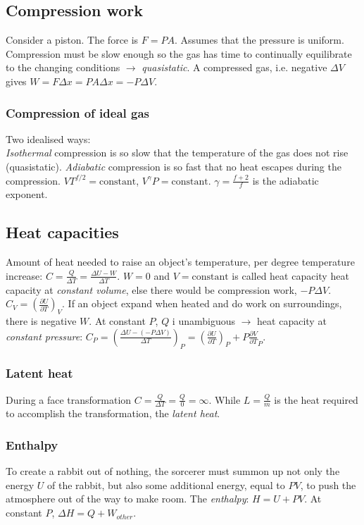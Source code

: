 \documentclass[11pt,twocolumn]{amsart}
\begin{document}
\subsection{Compression work}
Consider a piston. The force is $F=PA$. Assumes that the pressure is uniform. Compression must be slow enough so the gas has time to continually equilibrate to the changing conditions $\rightarrow$ \emph{quasistatic}. A compressed gas, i.e. negative $\Delta V$ gives $W=F\Delta x=PA\Delta x = -P\Delta V$. 
\subsubsection{Compression of ideal gas}
Two idealised ways: \\ \emph{Isothermal} compression is so slow that the temperature of the gas does not rise (quasistatic). \emph{Adiabatic} compression is so fast that no heat escapes during the compression. $VT^{f/2}=\text{constant}$, $V^{\gamma}P=\text{constant}$. $\gamma=\frac{f+2}{f}$ is the adiabatic exponent.

\subsection{Heat capacities}
Amount of heat needed to raise an object's temperature, per degree temperature increase: $C = \frac{Q}{\Delta T} = \frac{\Delta U - W}{\Delta T} $. $W=0$ and $V =\text{constant}$ is called heat capacity heat capacity at \emph{constant volume}, else there would be compression work, $-P\Delta V$. $C_V=\left(\frac{\partial U}{\partial T}\right)_V$. If an object expand when heated and do work on surroundings, there is negative $W$. At constant $P$, $Q$ i unambiguous $\rightarrow$ heat capacity at \emph{constant pressure}: $C_P = \left(\frac{\Delta U -(-P\Delta V)}{\Delta T}\right)_P=\left(\frac{\partial U}{\partial T}\right)_P + P\frac{\partial V}{\partial T}_P$.
\subsubsection{Latent heat} During a face transformation $C = \frac{Q}{\Delta T} = \frac{Q}{0} = \infty$. While $L=\frac{Q}{m}$ is the heat required to accomplish the transformation, the \emph{latent heat}.
\subsubsection{Enthalpy} To create a rabbit out of nothing, the sorcerer must summon up not only the energy $U$ of the rabbit, but also some additional energy, equal to $PV$, to push the atmosphere out of the way to make room. The \emph{enthalpy}: $H= U + PV$. At constant $P$, $\Delta H = Q + W_{other}$.
\end{document}
